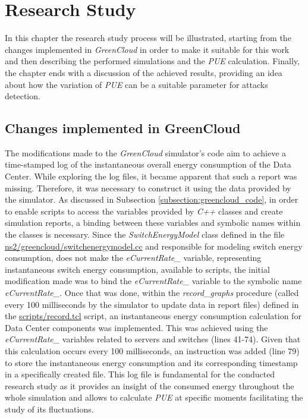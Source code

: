 \chapter{Research Study} \label{chapter:research_study}

\begin{citazione}
In this chapter the research study process will be illustrated, starting from the changes implemented in \emph{GreenCloud} in order to make it suitable for this work and then describing the performed simulations and the \emph{PUE} calculation. Finally, the chapter ends with a discussion of the achieved results, providing an idea about how the variation of \emph{PUE} can be a suitable parameter for attacks detection.
\end{citazione}
\newpage

\section{Changes implemented in GreenCloud}\label{section:greencloud_mod}
The modifications made to the \emph{GreenCloud} simulator's code aim to achieve a time-stamped log of the instantaneous overall energy consumption of the Data Center. While exploring the log files, it became apparent that such a report was missing. Therefore, it was necessary to construct it using the data provided by the simulator. As discussed in Subsection \ref{subsection:greencloud_code}, in order to enable scripts to access the variables provided by \emph{C++} classes and create simulation reports, a binding between these variables and symbolic names within the classes is necessary. Since the \emph{SwitchEnergyModel} class defined in the file \href{https://github.com/vincenzo-emanuele/masters-degree-thesis/blob/main/greencloud_modified_src/ns2/greencloud/switchenergymodel.cc}{ns2/greencloud/switchenergymodel.cc} and responsible for modeling switch energy consumption, does not make the \emph{eCurrentRate\_} variable, representing instantaneous switch energy consumption, available to scripts, the initial modification made was to bind the \emph{eCurrentRate\_} variable to the symbolic name \emph{eCurrentRate\_}. Once that was done, within the \emph{record\_graphs} procedure (called every 100 milliseconds by the simulator to update data in report files) defined in the \href{https://github.com/vincenzo-emanuele/masters-degree-thesis/blob/main/greencloud\_modified\_src/scripts/record.tcl}{scripts/record.tcl} script, an instantaneous energy consumption calculation for Data Center components was implemented. This was achieved using the \emph{eCurrentRate\_} variables related to servers and switches (lines 41-74). Given that this calculation occurs every 100 milliseconds, an instruction was added (line 79) to store the instantaneous energy consumption and its corresponding timestamp in a specifically created file. This log file is fundamental for the conducted research study as it provides an insight of the consumed energy throughout the whole simulation and allows to calculate \emph{PUE} at specific moments facilitating the study of its fluctuations.

